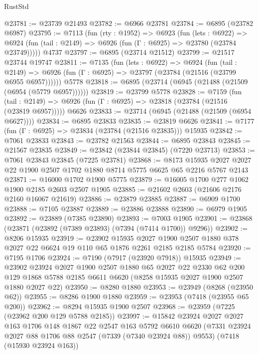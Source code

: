 \begin{lexlean}{RustStd}
\begin{coremodule}
@23781 := @23739 @21493
@23782 := @6966 @23781
@23784 := @6895 (@23782 @6987)
@23795 := @7113
    (fun (rty : @1952) =>
    @6923
      (fun (lets : @6922) =>
      @6924 (fun (tail : @2149) => @6926 (fun (Γ : @6925) => @23780 (@23784 @23749)))))
    @4737
@23797 := @6895 (@23714 @21512)
@23799 := @21517 @23744 @19747
@23811 := @7135
    (fun (lets : @6922) =>
    @6924
      (fun (tail : @2149) =>
      @6926 (fun (Γ : @6925) => @23797 (@23784 (@21516 (@23799 @6955 @6957))))))
    @5778
@23818 := @6895 (@23714 (@6945 (@21488 (@21509 (@6954 (@5779 @6957))))))
@23819 := @23799 @5778
@23828 := @7159
    (fun (tail : @2149) => @6926 (fun (Γ : @6925) => @23818 (@23784 (@21516 (@23819 @6957)))))
    @6626
@23833 := @23714 (@6945 (@21488 (@21509 (@6954 @6627))))
@23834 := @6895 @23833
@23835 := @23819 @6626
@23841 := @7177 (fun (Γ : @6925) => @23834 (@23784 (@21516 @23835))) @15935
@23842 := @7061 @23833
@23843 := @23782 @21563
@23844 := @6895 @23843
@23845 := @21567 @23835
@23849 := @23842 (@23844 @23845) (@7220 @23713)
@23853 := @7061 @23843 @23845 (@7225 @23781)
@23868 := @8173
    @15935
    @2027
    @2027
    @22
    @1900
    @2507
    @1702
    @1880
    @8714
    @5775
    @6625
    @65
    @2216
    @5767
    @2143
@23871 := @16000 @1702 @1900 @5775
@23879 := @16005 @1700 @277 @1062 @1900 @2185 @2603 @2507 @1905
@23885 := @21602 @2603 (@21606 @2176 @2160 @16067 @21619)
@23886 := @23879 @23885
@23887 := @6909 @1700
@23888 := @7105 @23887
@23889 := @23886 @23888
@23890 := @6979 @1905
@23892 := @23889 (@7385 @23890)
@23893 := @7003 @1905
@23901 := @23868 (@23871 (@23892 (@7389 @23893) (@7394 (@7414 @1700)) @9296))
@23902 := @8206 @15935
@23919 := @23902
    @15935
    @2027
    @1900
    @2507
    @1880
    @378
    @2027
    @22
    @6624
    @19
    @110
    @65
    @1876
    @2261
    @2185
    @2185
    @5784
@23920 := @7195 @1706
@23924 := @7190 (@7917 (@23920 @7918)) @15935
@23949 := @23902
    @23924
    @2027
    @1900
    @2507
    @1880
    @65
    @2027
    @22
    @2330
    @62
    @200
    @129
    @1868
    @5788
    @2185
    @6611
    @6620
    (@8258 @15935 @2027 @1900 @2507 @1880 @2027 @22)
@23950 := @8280 @1880
@23953 := @23949 (@8268 (@23950 @62))
@23955 := @8286 @1900 @1880
@23959 := @23953 (@7418 (@23955 @65 @200))
@23962 := @8294 @15935 @1900 @2507
@23968 := @23959 (@7225 (@23962 @200 @129 @5788 @2185))
@23997 := @15842
    @23924
    @2027
    @2027
    @163
    @1706
    @148
    @1867
    @22
    @2547
    @163
    @5792
    @6610
    @6620
    (@7331 @23924 @2027 @88 @1706 @88 @2547 (@7339 (@7340 @23924 @88)) @9553)
    (@7418 (@15930 @23924 @163))

\end{coremodule}
\end{lexlean}
